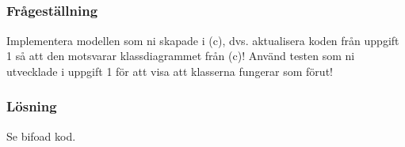 \subsection{}\label{sec:uppg2d}
\subsubsection*{Frågeställning}
Implementera modellen som ni skapade i (c), dvs. aktualisera koden från
uppgift 1 så att den motsvarar klassdiagrammet från (c)!
Använd testen som ni utvecklade i uppgift 1 för att visa att klasserna fungerar
som förut!

\subsubsection*{Lösning}
Se bifoad kod.
